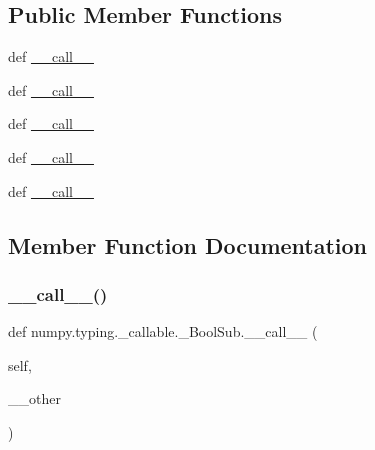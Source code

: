 \subsection*{Public Member Functions}
\begin{DoxyCompactItemize}
\item 
def \hyperlink{classnumpy_1_1typing_1_1__callable_1_1__BoolSub_a2fc15a4cf347f91dfb290f5e6dfa5cfb}{\+\_\+\+\_\+call\+\_\+\+\_\+}
\item 
def \hyperlink{classnumpy_1_1typing_1_1__callable_1_1__BoolSub_a2fc15a4cf347f91dfb290f5e6dfa5cfb}{\+\_\+\+\_\+call\+\_\+\+\_\+}
\item 
def \hyperlink{classnumpy_1_1typing_1_1__callable_1_1__BoolSub_a2fc15a4cf347f91dfb290f5e6dfa5cfb}{\+\_\+\+\_\+call\+\_\+\+\_\+}
\item 
def \hyperlink{classnumpy_1_1typing_1_1__callable_1_1__BoolSub_a2fc15a4cf347f91dfb290f5e6dfa5cfb}{\+\_\+\+\_\+call\+\_\+\+\_\+}
\item 
def \hyperlink{classnumpy_1_1typing_1_1__callable_1_1__BoolSub_a2fc15a4cf347f91dfb290f5e6dfa5cfb}{\+\_\+\+\_\+call\+\_\+\+\_\+}
\end{DoxyCompactItemize}


\subsection{Member Function Documentation}
\mbox{\label{classnumpy_1_1typing_1_1__callable_1_1__BoolSub_a2fc15a4cf347f91dfb290f5e6dfa5cfb}} 
\subsubsection{\texorpdfstring{\+\_\+\+\_\+call\+\_\+\+\_\+()}{\_\_call\_\_()}\hspace{0.1cm}{\footnotesize\ttfamily [1/5]}}
{\footnotesize\ttfamily def numpy.\+typing.\+\_\+callable.\+\_\+\+Bool\+Sub.\+\_\+\+\_\+call\+\_\+\+\_\+ (\begin{DoxyParamCaption}\item[{}]{self,  }\item[{}]{\+\_\+\+\_\+other }\end{DoxyParamCaption})}

